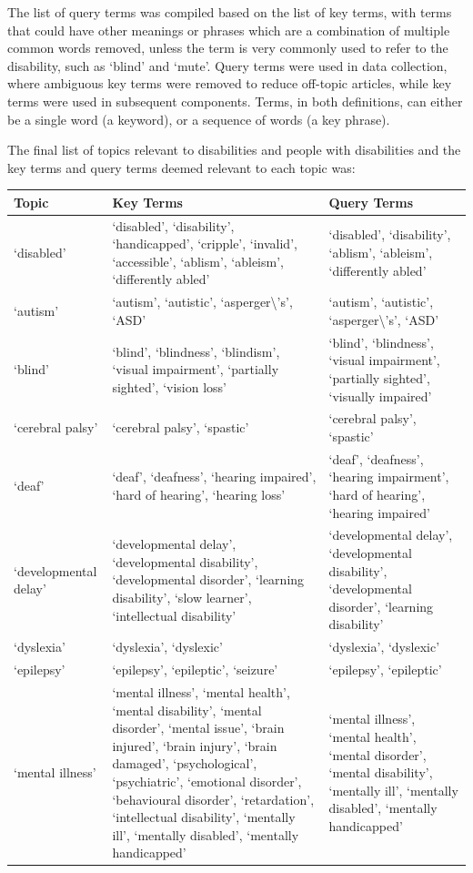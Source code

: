 \documentclass{report}
\begin{document}
The list of query terms was compiled based on the list of key terms, with terms that could have other meanings or phrases which are a combination of multiple common words removed, unless the term is very commonly used to refer to the disability, such as `blind' and `mute'.
Query terms were used in data collection, where ambiguous key terms were removed to reduce off-topic articles, while key terms were used in subsequent components.
Terms, in both definitions, can either be a single word (a keyword), or a sequence of words (a key phrase).

The final list of topics relevant to disabilities and people with disabilities and the key terms and query terms deemed relevant to each topic was: 

\begin{longtabu} to \textwidth { | X[l] | X[l] | X[l] | } 
	\hline
	Topic & Key Terms & Query Terms \\ 
	\hline
	`disabled' & `disabled', `disability', `handicapped', `cripple', `invalid', `accessible', `ablism', `ableism', `differently abled' & `disabled', `disability', `ablism', `ableism', `differently abled' \\ 
	\hline
	`autism' & `autism', `autistic', `asperger\textbackslash's', `ASD' & `autism', `autistic', `asperger\textbackslash's', `ASD' \\ 
	\hline
	`blind' & `blind', `blindness', `blindism', `visual impairment', `partially sighted', `vision loss' & `blind', `blindness', `visual impairment', `partially sighted', `visually impaired' \\ 
	\hline
	`cerebral palsy' & `cerebral palsy', `spastic' & `cerebral palsy', `spastic' \\ 
	\hline
	`deaf' & `deaf', `deafness', `hearing impaired', `hard of hearing', `hearing loss' & `deaf', `deafness', `hearing impairment', `hard of hearing', `hearing impaired' \\ 
	\hline
	`developmental delay' & `developmental delay', `developmental disability', `developmental disorder', `learning disability', `slow learner', `intellectual disability' & `developmental delay', `developmental disability', `developmental disorder', `learning disability' \\ 
	\hline
	`dyslexia' & `dyslexia', `dyslexic' & `dyslexia', `dyslexic' \\ 
	\hline
	`epilepsy' & `epilepsy', `epileptic', `seizure' & `epilepsy', `epileptic' \\ 
	\hline
	`mental illness' & `mental illness', `mental health', `mental disability', `mental disorder', `mental issue', `brain injured', `brain injury', `brain damaged', `psychological', `psychiatric', `emotional disorder', `behavioural disorder', `retardation', `intellectual disability', `mentally ill', `mentally disabled', `mentally handicapped' & `mental illness', `mental health', `mental disorder', `mental disability', `mentally ill', `mentally disabled', `mentally handicapped' \\ 

\end{longtabu}
\end{document}
